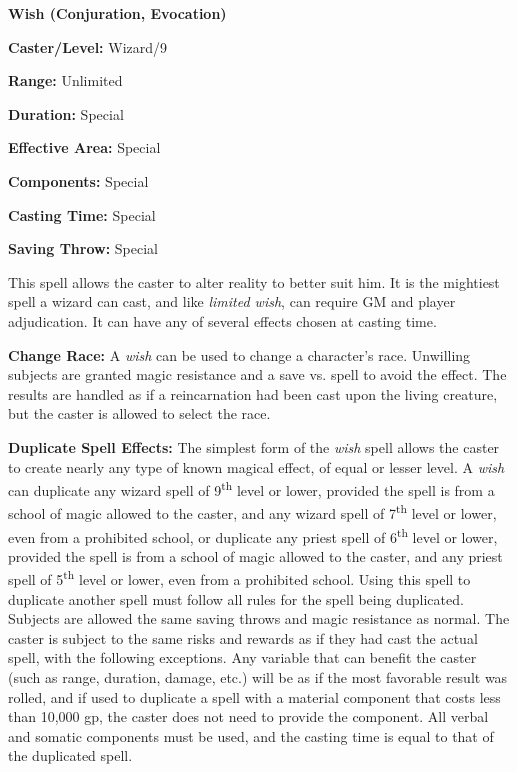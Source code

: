 \begin{multicols}{2}
\begin{minipage}{\columnwidth}
\noindent \textbf{Wish (Conjuration, Evocation)}

\noindent \textbf{Caster/Level:} Wizard/9

\noindent \textbf{Range:} Unlimited

\noindent \textbf{Duration:} Special

\noindent \textbf{Effective Area:} Special

\noindent \textbf{Components:} Special

\noindent \textbf{Casting Time:} Special

\noindent \textbf{Saving Throw:} Special

\end{minipage}

This spell allows the caster to alter reality to better suit him.  It is the mightiest spell a wizard can cast, and like \textit{limited wish}, can require GM and player adjudication.  It can have any of several effects chosen at casting time.

\textbf{Change Race:} A \textit{wish} can be used to change a character's race.  Unwilling subjects are granted magic resistance and a save vs. spell to avoid the effect.  The results are handled as if a reincarnation had been cast upon the living creature, but the caster is allowed to select the race.  

\textbf{Duplicate Spell Effects:} The simplest form of the \textit{wish} spell allows the caster to create nearly any type of known magical effect, of equal or lesser level.  A \textit{wish} can duplicate any wizard spell of 9\textsuperscript{th} level or lower, provided the spell is from a school of magic allowed to the caster, and any wizard spell of 7\textsuperscript{th} level or lower, even from a prohibited school, or duplicate any priest spell of 6\textsuperscript{th} level or lower, provided the spell is from a school of magic allowed to the caster, and any priest spell of 5\textsuperscript{th} level or lower, even from a prohibited school.  Using this spell to duplicate another spell must follow all rules for the spell being duplicated.  Subjects are allowed the same saving throws and magic resistance as normal.  The caster is subject to the same risks and rewards as if they had cast the actual spell, with the following exceptions.  Any variable that can benefit the caster (such as range, duration, damage, etc.) will be as if the most favorable result was rolled, and if used to duplicate a spell with a material component that costs less than 10,000 gp, the caster does not need to provide the component.  All verbal and somatic components must be used, and the casting time is equal to that of the duplicated spell.


\end{multicols}
